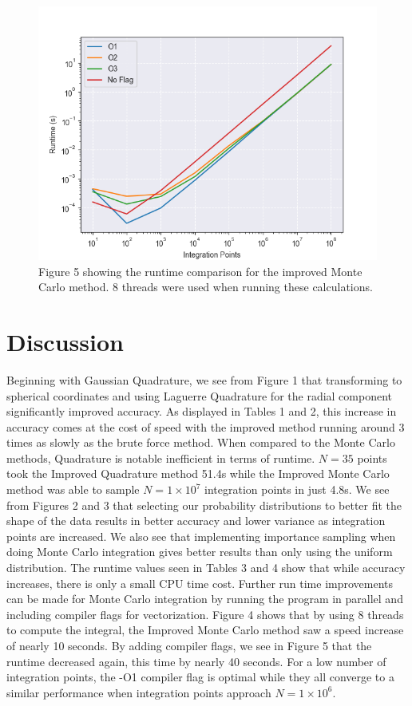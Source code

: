 \documentclass{emulateapj}
\begin{document}
\begin{figure}[H]
    \centering
    \includegraphics[scale=0.5]{flags.png}
    \caption{Figure 5 showing the runtime comparison for the improved Monte Carlo method. 8 threads were used when running these calculations.}
    \label{fig:fig5}
\end{figure}

\section{Discussion}
\label{sec:discussion}
Beginning with Gaussian Quadrature, we see from Figure 1 that transforming to spherical coordinates and using Laguerre Quadrature for the radial component significantly improved accuracy. As displayed in Tables 1 and 2, this increase in accuracy comes at the cost of speed with the improved method running around 3 times as slowly as the brute force method. When compared to the Monte Carlo methods, Quadrature is notable inefficient in terms of runtime. $N=35$ points took the Improved Quadrature method 51.4s while the Improved Monte Carlo method was able to sample $N = 1\times10^{7}$ integration points in just 4.8s. We see from Figures 2 and 3 that selecting our probability distributions to better fit the shape of the data results in better accuracy and lower variance as integration points are increased. We also see that implementing importance sampling when doing Monte Carlo integration gives better results than only using the uniform distribution. The runtime values seen in Tables 3 and 4 show that while accuracy increases, there is only a small CPU time cost. Further run time improvements can be made for Monte Carlo integration by running the program in parallel and including compiler flags for vectorization. Figure 4 shows that by using 8 threads to compute the integral, the Improved Monte Carlo method saw a speed increase of nearly 10 seconds. By adding compiler flags, we see in Figure 5 that the runtime decreased again, this time by nearly 40 seconds. For a low number of integration points, the -O1 compiler flag is optimal while they all converge to a similar performance when integration points approach $N=1\times10^{6}.$
\end{document}
